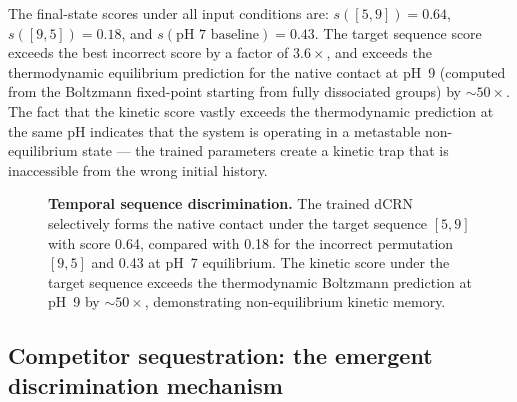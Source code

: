 \documentclass[10pt,twocolumn]{article}
\begin{document}
The final-state scores under all input conditions are: $s([5,9]) = 0.64$, $s([9,5]) = 0.18$, and $s(\text{pH~7 baseline}) = 0.43$.
The target sequence score exceeds the best incorrect score by a factor of $3.6\times$, and exceeds the thermodynamic equilibrium prediction for the native contact at pH~9 (computed from the Boltzmann fixed-point starting from fully dissociated groups) by $\sim 50\times$.
The fact that the kinetic score vastly exceeds the thermodynamic prediction at the same pH indicates that the system is operating in a metastable non-equilibrium state — the trained parameters create a kinetic trap that is inaccessible from the wrong initial history.

\begin{figure}[H]
  \centering
  \caption{\textbf{Temporal sequence discrimination.}
    The trained dCRN selectively forms the native contact under the
    target sequence $[5,9]$ with score 0.64, compared with 0.18 for the
    incorrect permutation $[9,5]$ and 0.43 at pH~7 equilibrium.
    The kinetic score under the target sequence exceeds the thermodynamic
    Boltzmann prediction at pH~9 by $\sim 50\times$, demonstrating
    non-equilibrium kinetic memory.}
  \label{fig:results}
\end{figure}

\subsection{Competitor sequestration: the emergent discrimination mechanism}
\end{document}
